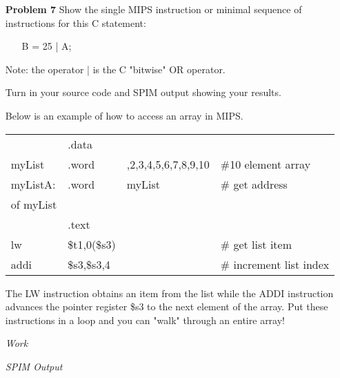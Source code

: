 \documentclass[12pt]{article}
\begin{document}
\begin{enumerate}
  \item[\textbf{Problem 7}] Show the single MIPS instruction or minimal sequence of instructions for this C statement:
  \begin{enumerate}\ttfamily
    \item[] B = 25 | A;
  \end{enumerate}

  \item[] Note: the operator | is the C "bitwise" OR operator.

  \item[] Turn in your source code and SPIM output showing your results.

  \item[] Below is an example of how to access an array in MIPS.

  \begin{tabular}{>{\ttfamily}p{4em}>{\ttfamily}p{5em}>{\ttfamily}p{10em}>{\ttfamily}p{10em}}
              & .data	  & & \\
		myList    & .word	  & 1,2,3,4,5,6,7,8,9,10 & \#10 element array \\
		myListA:  & .word   & myList & \# get address \\
		of myList &       	&        & \\
		          & .text	  &        & \\
		lw        & \$t1,0(\$s3)	& & \# get list item \\
		addi      & \$s3,\$s3,4 	& & \# increment list index \\
  \end{tabular}

  \item[] The LW instruction obtains an item from the list while the ADDI instruction advances the pointer register \$s3 to the next element of the array. Put these instructions in a loop and you can "walk" through an entire array!
\end{enumerate}

\begin{enumerate}
  \item[\textit{Work}]
  \item[\textit{SPIM Output}]
\end{enumerate}
\end{document}

